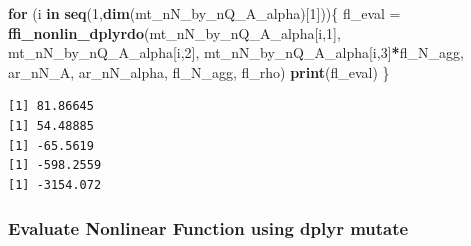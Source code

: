 \documentclass[
]{book}
\newenvironment{Shaded}{\begin{snugshade}}{\end{snugshade}}
\newcommand{\ControlFlowTok}[1]{\textcolor[rgb]{0.13,0.29,0.53}{\textbf{#1}}}
\newcommand{\DecValTok}[1]{\textcolor[rgb]{0.00,0.00,0.81}{#1}}
\newcommand{\KeywordTok}[1]{\textcolor[rgb]{0.13,0.29,0.53}{\textbf{#1}}}
\newcommand{\NormalTok}[1]{#1}
\newcommand{\OperatorTok}[1]{\textcolor[rgb]{0.81,0.36,0.00}{\textbf{#1}}}
\newcommand{\StringTok}[1]{\textcolor[rgb]{0.31,0.60,0.02}{#1}}
\begin{document}
\begin{Shaded}
\begin{Highlighting}[]
\ControlFlowTok{for}\NormalTok{ (i }\ControlFlowTok{in} \KeywordTok{seq}\NormalTok{(}\DecValTok{1}\NormalTok{,}\KeywordTok{dim}\NormalTok{(mt_nN_by_nQ_A_alpha)[}\DecValTok{1}\NormalTok{]))\{}
\NormalTok{  fl_eval =}\StringTok{ }\KeywordTok{ffi_nonlin_dplyrdo}\NormalTok{(mt_nN_by_nQ_A_alpha[i,}\DecValTok{1}\NormalTok{],}
\NormalTok{                               mt_nN_by_nQ_A_alpha[i,}\DecValTok{2}\NormalTok{],}
\NormalTok{                               mt_nN_by_nQ_A_alpha[i,}\DecValTok{3}\NormalTok{]}\OperatorTok{*}\NormalTok{fl_N_agg,}
\NormalTok{                               ar_nN_A, ar_nN_alpha, fl_N_agg, fl_rho)}
  \KeywordTok{print}\NormalTok{(fl_eval)}
\NormalTok{\}}
\end{Highlighting}
\end{Shaded}

\begin{verbatim}
[1] 81.86645
[1] 54.48885
[1] -65.5619
[1] -598.2559
[1] -3154.072
\end{verbatim}

\hypertarget{evaluate-nonlinear-function-using-dplyr-mutate}{%
\subsubsection{Evaluate Nonlinear Function using dplyr mutate}\label{evaluate-nonlinear-function-using-dplyr-mutate}}
\end{document}
